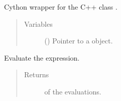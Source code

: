 \documentclass[letterpaper,10pt,english]{sphinxmanual}
\begin{document}
\begin{fulllineitems}
\label{\detokenize{api:grids.parser.parser_1d.Parser1d}}
Cython wrapper for the C++ class .
\begin{quote}\begin{description}
\item[{Variables}] \leavevmode
{} () \textendash{} Pointer to a  object.

\end{description}\end{quote}

\begin{fulllineitems}
\label{\detokenize{api:grids.parser.parser_1d.Parser1d.evaluate}}
Evaluate the expression.
\begin{quote}\begin{description}
\item[{Returns}] \leavevmode
{} of the evaluations.

\end{description}\end{quote}

\end{fulllineitems}


\end{fulllineitems}

\end{document}
